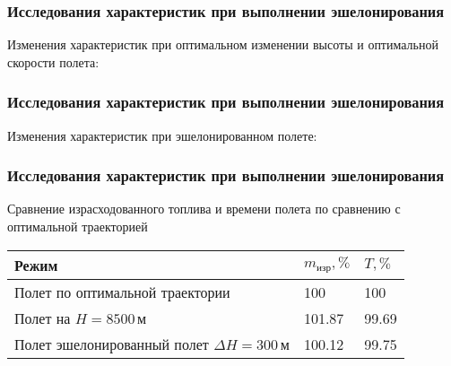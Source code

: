 \documentclass{beamer}
\begin{document}
\begin{frame}[t]
    \frametitle{Исследования характеристик при выполнении эшелонирования}
    \begin{center}
        Изменения характеристик при оптимальном изменении высоты и оптимальной
        скорости полета:

        \begin{minipage}{0.49\textwidth}
            \centering
            \resizebox{1.0\textwidth}{!}{}
        \end{minipage}
        \hfill
        \begin{minipage}{0.49\textwidth}
            \centering
            \resizebox{1.0\textwidth}{!}{}
        \end{minipage}
    \end{center}
\end{frame}

\begin{frame}[t]
    \frametitle{Исследования характеристик при выполнении эшелонирования}
    \begin{center}
        Изменения характеристик при эшелонированном полете: 

        \begin{minipage}{0.49\textwidth}
            \centering
            \resizebox{1.0\textwidth}{!}{}
        \end{minipage}
        \hfill
        \begin{minipage}{0.49\textwidth}
            \centering
            \resizebox{1.0\textwidth}{!}{
            }
        \end{minipage}
    \end{center}
\end{frame}


\begin{frame}[t]
    \frametitle{Исследования характеристик при выполнении эшелонирования}
    \begin{center}

    Сравнение израсходованного топлива и времени полета по сравнению с
    оптимальной траекторией    
\begin{tabular}{|p{}|p{}|p{}|}
    \hline
    Режим & $m_{изр}, \%$ & $T, \%$\\
    \hline
    Полет по оптимальной траектории & 100 & 100 \\
    \hline
    Полет на $H=8500\,м$ & 101.87 & 99.69\\
    \hline
    Полет эшелонированный полет $\Delta H =300\, м$ & 100.12 & 99.75\\
    \hline
\end{tabular}
    \end{center}
\end{frame}
\end{document}

